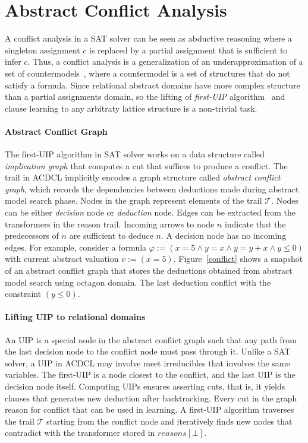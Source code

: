 \section{Abstract Conflict Analysis}
A conflict analysis in a SAT solver can be seen as abductive 
reasoning where a singleton assignment $c$ is replaced by a partial 
assignment that is sufficient to infer $c$.  Thus, a conflict 
analysis is a generalization of an underapproximation of a set of 
countermodels~\cite{sas12,dhk2013-popl}, where a countermodel is a 
set of structures that do not satisfy a formula.  Since relational 
abstract domains have more complex structure than a partial 
assignments domain, so the lifting of {\em first-UIP} algorithm~\cite{uip} 
and clause learning to any arbitraty lattice structure is a non-trivial task. 

\paragraph {\textbf{Abstract Conflict Graph}}
The first-UIP algorithm in SAT solver works on a data structure called 
{\em implication graph} that computes a cut that suffices to produce a 
conflict.  The trail in ACDCL implicitly encodes a graph structure called 
{\em abstract conflict graph}, which records the dependencies between 
deductions made during abstract model search phase.  Nodes in the graph 
represent elements of the trail $\mathcal{T}$.  Nodes can be either 
{\em decision} node or {\em deduction} node. Edges can be extracted from
the transformers in the reason trail.  Incoming arrows to node $n$ 
indicate that the predecessors of $n$ are sufficient to deduce $n$.  
A decision node has no incoming edges.  
For example, consider a formula 
$\varphi:= (x=5 \wedge y=x \wedge y=y+x \wedge y \leq 0)$ with current 
abstract valuation $v:= (x=5)$.  Figure~\ref{conflict} shows a 
snapshot of an abstract conflict graph that 
stores the deductions obtained from abstract model search using octagon domain.  
The last deduction conflict with the constraint $(y \leq 0)$.  

\paragraph {\textbf{Lifting UIP to relational domains}}
An UIP is a special node in the abstract conflict graph such that 
any path from the last decision node to the conflict node must pass 
through it.  Unlike a SAT solver, a UIP in ACDCL may involve meet irreducibles 
that involves the same variables.  The first-UIP is a node closest to the 
conflict, and the last UIP is the decision node itself.  Computing UIPs ensures 
asserting cuts, that is, it yields clauses that generates new deduction after 
backtracking.  Every cut in the graph reason for conflict that can be used in learning.  
A first-UIP algorithm traverses the trail $\mathcal{T}$ starting from the 
conflict node and iteratively finds new nodes that contradict with the 
transformer stored in $reasons[\bot]$.  

